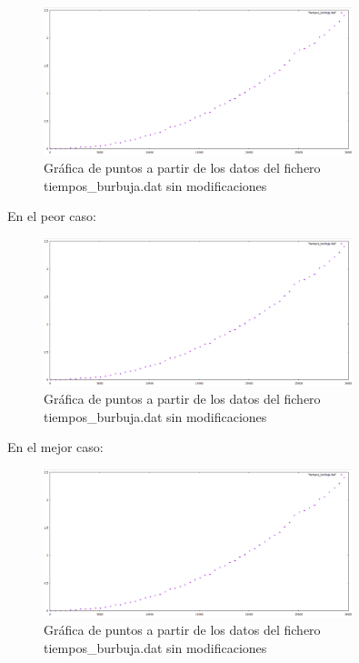 \documentclass[paper=a4, fontsize=10pt]{scrartcl} %
\begin{document}
\begin{figure}[H] %
	\centering
	\label{lsblk}
	\includegraphics[width=0.8\textwidth]{../imgs/c1.PNG}
	\caption{Gráfica de puntos a partir de los datos del fichero tiempos\_burbuja.dat sin modificaciones} 
\end{figure}

En el peor caso:
\begin{figure}[H] %
	\centering
	\label{lsblk}
	\includegraphics[width=0.8\textwidth]{../imgs/c1.PNG}
	\caption{Gráfica de puntos a partir de los datos del fichero tiempos\_burbuja.dat sin modificaciones} 
\end{figure}

En el mejor caso:
\begin{figure}[H] %
	\centering
	\label{lsblk}
	\includegraphics[width=0.8\textwidth]{../imgs/c1.PNG}
	\caption{Gráfica de puntos a partir de los datos del fichero tiempos\_burbuja.dat sin modificaciones} 
\end{figure}
\end{document}
